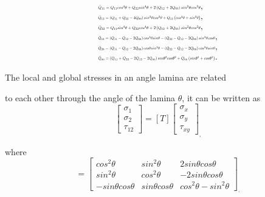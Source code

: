 \begin{equation}
	\begin{array}{l}
		\resizebox{.35\textwidth}{!}{$\bar{Q}_{11}=Q_{11} cos^{4}\theta+Q_{22} sin^{4}\theta+2\left(Q_{12}+2
		Q_{66}\right) sin^{2}\theta cos^{2}\theta$}, \\

		\resizebox{.35\textwidth}{!}{$\bar{Q}_{12}=\left(Q_{11}+Q_{22}-4 Q_{66}\right) sin^{2}\theta
		cos^{2}\theta+Q_{12}\left(cos^{4}\theta+sin^{2}\theta \right)$}, \\

		\resizebox{.35\textwidth}{!}{$\bar{Q}_{22}=Q_{11} sin^{4}\theta+Q_{22} cos^{4}\theta+2\left(Q_{12}+2
		Q_{66}\right) sin^{2}\theta cos^{2}\theta$}, \\

		\resizebox{.4\textwidth}{!}{$\bar{Q}_{16}=\left(Q_{11}-Q_{12}-2
		Q_{66}\right) cos^{3}\theta sin\theta-\left(Q_{22}-Q_{12}-2Q_{66}\right)
	sin^{3}\theta cos\theta$}, \\ 
		\resizebox{.4\textwidth}{!}{$\bar{Q}_{26}=\left(Q_{11}-Q_{12}-2
		Q_{66}\right) cos\theta sin^{3}\theta-\left(Q_{22}-Q_{12}-2
Q_{66}\right)cos^{3}\theta sin\theta$},
		 \\ 
	\resizebox{.4\textwidth}{!}	{$\bar{Q}_{66}=\left(Q_{11}+Q_{22}-2 Q_{12}-2 Q_{66}\right)
	sin\theta^{2}cos\theta^{2}+Q_{66}\left(sin\theta^{4}+cos\theta^{4}\right)$}.\\
	\end{array}
\end{equation}


The local and global stresses in an angle lamina are related

to each other through the angle of the lamina $\theta $, it can be written as 
\begin{equation}
	\left[\begin{array}{l}\sigma _{1} \\ \sigma _{2} \\
	\tau_{12}\end{array}\right]=[T]\left[\begin{array}{l}\sigma _{x} \\ 
	\sigma _{y} \\\tau_{xy}\end{array}\right]_{\textstyle ,}
\end{equation}

where
\begin{equation}
	[T]=\left[\begin{array}{ccc}cos^{2}\theta & sin^{2}\theta & 2
		sin\theta cos\theta \\ 
sin^{2}\theta & cos^{2}\theta & -2 sin\theta cos\theta \\
-sin\theta cos\theta
			  & sin\theta cos\theta  &cos^{2}\theta -sin^{2}\theta
\end{array}\right]_{\textstyle .} 
\end{equation}



